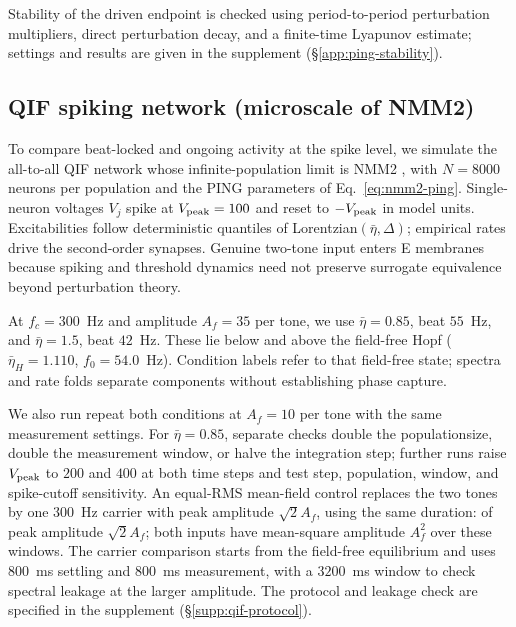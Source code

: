 \documentclass[11pt,a4paper]{article}
\providecommand{\DIFaddtex}[1]{{\protect\color{blue} \sf #1}} %
\providecommand{\DIFdeltex}[1]{{\protect\color{red} \scriptsize #1}} %
\providecommand{\DIFaddbegin}{} %
\providecommand{\DIFaddend}{} %
\providecommand{\DIFdelbegin}{} %
\providecommand{\DIFdelend}{} %
\providecommand{\DIFadd}[1]{\texorpdfstring{\DIFaddtex{#1}}{#1}} %
\providecommand{\DIFdel}[1]{\texorpdfstring{\DIFdeltex{#1}}{}} %
\begin{document}
\fi

Stability of the driven endpoint is checked using period-to-period perturbation
multipliers, direct perturbation decay, and a finite-time Lyapunov estimate;
settings and results are given in the supplement (\S\ref{app:ping-stability}).

\subsection{QIF spiking network (microscale of NMM2)}\label{sec:qif-methods}
To compare beat-locked and ongoing activity at the spike level, we simulate
the all-to-all QIF network whose infinite-population limit is
NMM2 \cite{montbrio2015,ruffini2025rosetta,clusella2023}, with $N=8000$
neurons per population and the PING parameters of Eq.~\eqref{eq:nmm2-ping}.
Single-neuron voltages $V_j$ spike at $V_{\rm peak}=100$ and reset to
$-V_{\rm peak}$ in model units. Excitabilities follow deterministic
quantiles of Lorentzian$(\bar\eta,\Delta)$; empirical rates drive the
second-order synapses. Genuine two-tone input enters E membranes because
spiking and threshold dynamics need not preserve surrogate equivalence
beyond perturbation theory.

At $f_c=300$~Hz and amplitude $A_f=35$ per tone, we use
$\bar\eta=0.85$, beat $55$~Hz, and $\bar\eta=1.5$, beat $42$~Hz.
These lie below and above the field-free Hopf
($\bar\eta_H=1.110$, $f_0=54.0$~Hz). Condition labels refer to that
field-free state; spectra and rate folds separate components without
establishing phase capture.

We \DIFdelbegin \DIFdel{also run }\DIFdelend \DIFaddbegin \DIFadd{repeat }\DIFaddend both conditions at $A_f=10$ \DIFdelbegin \DIFdel{per tone with the same measurement
settings. For $\bar\eta=0.85$, separate checks double the populationsize, double the measurement window,
or halve the integration step; further runs raise
$V_{\rm peak}$ to $200$ and $400$ at both time steps}\DIFdelend \DIFaddbegin \DIFadd{and test step, population, window,
and spike-cutoff sensitivity}\DIFaddend . An equal-RMS mean-field control replaces the
two tones by one $300$~Hz carrier \DIFdelbegin \DIFdel{with peak amplitude $\sqrt{2}A_f$, using the same duration: }\DIFdelend \DIFaddbegin \DIFadd{of peak amplitude $\sqrt2 A_f$;
}\DIFaddend both inputs have mean-square amplitude $A_f^2$\DIFdelbegin \DIFdel{over these windows. The carrier comparison starts from the
field-free equilibrium and uses $800$~ms settling and $800$~ms measurement,
with a $3200$~ms window to check spectral leakage
at the larger amplitude}\DIFdelend . \DIFaddbegin \DIFadd{The protocol and leakage
check are specified in the supplement (\S\ref{supp:qif-protocol}).
}\DIFaddend
\end{document}
